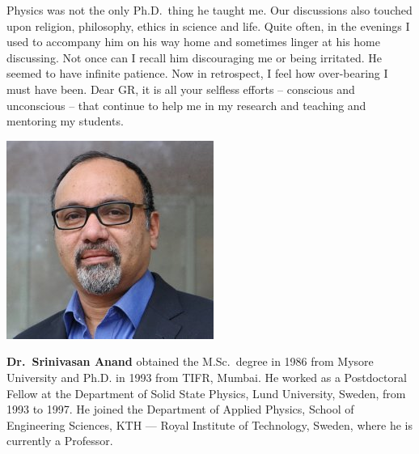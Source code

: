 Physics was not the only Ph.D.\ thing he taught me. Our discussions also touched upon religion, philosophy, ethics in science and life. Quite often, in the evenings I used to accompany him on his way home and sometimes linger at his home discussing. Not once can I recall him discouraging me or being irritated. He seemed to have infinite patience. Now in retrospect, I feel how over-bearing I must have been. Dear GR, it is all your selfless efforts – conscious and unconscious – that continue to help me in my research and teaching and mentoring my students.
\bigskip

\drawline
\bigskip
\bigskip

\centerline{\includegraphics[scale=0.5]{authorsphotos/Prof_Srinivasan_Anand.jpg}}
\bigskip

\noindent
{\biofntsize\textbf{Dr.\ Srinivasan Anand} obtained the M.Sc.\ degree in 1986 from Mysore University and Ph.D. in 1993 from TIFR, Mumbai. He worked as a Postdoctoral Fellow at the Department of Solid State Physics, Lund University, Sweden, from 1993 to 1997. He joined the Department of Applied Physics, School of Engineering Sciences, KTH --- Royal Institute of Technology, Sweden, where he is currently a Professor.}
